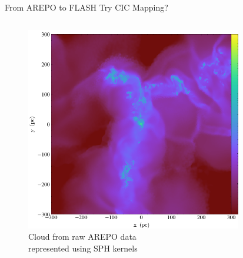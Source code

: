 \documentclass[aspectratio=169]{beamer}
\begin{document}
\begin{frame}{From AREPO to FLASH} {Try CIC Mapping?}
    \begin{columns}
        \begin{column}{0.35\textwidth}
            \begin{figure}[h!]
                \centering
                \includegraphics[width=\linewidth]{../images/AREPO_cloud.png} \\
                Cloud from raw AREPO data \\
                represented using SPH kernels
                \label{fig:voronoi_example}
            \end{figure}
        \end{column}
        \begin{column}{0.35\textwidth}
            \begin{figure}[h!]
                \centering

\end{figure}
\end{column}
\end{columns}
\end{frame}
\end{document}
